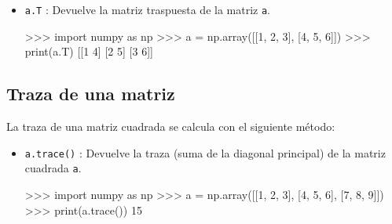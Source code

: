 \documentclass[
  spanish,
  a4paper,
]{scrreport}
\newenvironment{Shaded}{\begin{snugshade}}{\end{snugshade}}
\newcommand{\BuiltInTok}[1]{\textcolor[rgb]{0.00,0.23,0.31}{#1}}
\newcommand{\DecValTok}[1]{\textcolor[rgb]{0.68,0.00,0.00}{#1}}
\newcommand{\ImportTok}[1]{\textcolor[rgb]{0.00,0.46,0.62}{#1}}
\newcommand{\NormalTok}[1]{\textcolor[rgb]{0.00,0.23,0.31}{#1}}
\newcommand{\OperatorTok}[1]{\textcolor[rgb]{0.37,0.37,0.37}{#1}}
\begin{document}
\begin{itemize}
\item
  \texttt{a.T} : Devuelve la matriz traspuesta de la matriz \texttt{a}.

\begin{Shaded}
\begin{Highlighting}[]
\OperatorTok{\textgreater{}\textgreater{}\textgreater{}} \ImportTok{import}\NormalTok{ numpy }\ImportTok{as}\NormalTok{ np}
\OperatorTok{\textgreater{}\textgreater{}\textgreater{}}\NormalTok{ a }\OperatorTok{=}\NormalTok{ np.array([[}\DecValTok{1}\NormalTok{, }\DecValTok{2}\NormalTok{, }\DecValTok{3}\NormalTok{], [}\DecValTok{4}\NormalTok{, }\DecValTok{5}\NormalTok{, }\DecValTok{6}\NormalTok{]])}
\OperatorTok{\textgreater{}\textgreater{}\textgreater{}} \BuiltInTok{print}\NormalTok{(a.T)}
\NormalTok{[[}\DecValTok{1} \DecValTok{4}\NormalTok{]}
\NormalTok{[}\DecValTok{2} \DecValTok{5}\NormalTok{]}
\NormalTok{[}\DecValTok{3} \DecValTok{6}\NormalTok{]]}
\end{Highlighting}
\end{Shaded}
\end{itemize}

\subsection{Traza de una matriz}\label{traza-de-una-matriz}

La traza de una matriz cuadrada se calcula con el siguiente método:

\begin{itemize}
\item
  \texttt{a.trace()} : Devuelve la traza (suma de la diagonal principal)
  de la matriz cuadrada \texttt{a}.

\begin{Shaded}
\begin{Highlighting}[]
\OperatorTok{\textgreater{}\textgreater{}\textgreater{}} \ImportTok{import}\NormalTok{ numpy }\ImportTok{as}\NormalTok{ np}
\OperatorTok{\textgreater{}\textgreater{}\textgreater{}}\NormalTok{ a }\OperatorTok{=}\NormalTok{ np.array([[}\DecValTok{1}\NormalTok{, }\DecValTok{2}\NormalTok{, }\DecValTok{3}\NormalTok{], [}\DecValTok{4}\NormalTok{, }\DecValTok{5}\NormalTok{, }\DecValTok{6}\NormalTok{], [}\DecValTok{7}\NormalTok{, }\DecValTok{8}\NormalTok{, }\DecValTok{9}\NormalTok{]])}
\OperatorTok{\textgreater{}\textgreater{}\textgreater{}} \BuiltInTok{print}\NormalTok{(a.trace())}
\DecValTok{15}
\end{Highlighting}
\end{Shaded}
\end{itemize}
\end{document}
